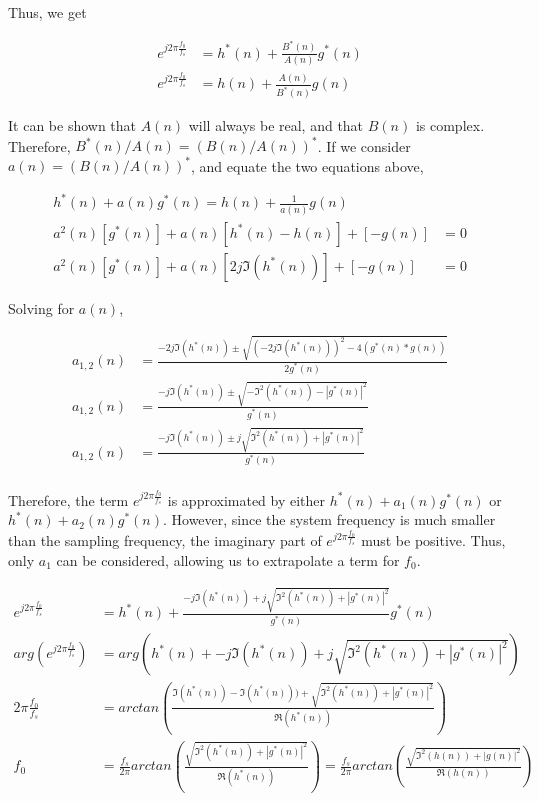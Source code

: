 \documentclass[main.tex]{subfiles}
\begin{document}
Thus, we get

\begin{align*}
e^{j2\pi\frac{f_0}{f_s}} &= h^*(n) + \frac{B^*(n)}{A(n)}g^*(n)\\
e^{j2\pi\frac{f_0}{f_s}} &= h(n) + \frac{A(n)}{B^*(n)}g(n)
\end{align*}

It can be shown that $A(n)$ will always be real, and that $B(n)$ is complex. Therefore, $B^*(n)/A(n) = \left(B(n)/A(n)\right)^*$. If we consider $a(n) = (B(n)/A(n))^*$, and equate the two equations above,

\begin{align*}
h^*(n) + a(n)g^*(n) = h(n) + \frac{1}{a(n)}g(n)\\
a^2(n)\left[g^*(n)\right] + a(n)\left[h^*(n) - h(n)\right] + \left[-g(n)\right] &= 0\\
a^2(n)\left[g^*(n)\right] + a(n)\left[2j\Im(h^*(n))\right] + \left[-g(n)\right] &= 0
\end{align*}

Solving for $a(n)$,

\begin{align*}
a_{1,2}(n) &= \frac{-2j\Im(h^*(n)) \pm \sqrt{ (-2j\Im(h^*(n)))^2 -4(g^*(n) * g(n)) } }{2g^*(n)}\\
a_{1,2}(n) &= \frac{-j\Im(h^*(n)) \pm \sqrt{ -\Im^2(h^*(n)) -|g^*(n)|^2 } }{g^*(n)}\\
a_{1,2}(n) &= \frac{-j\Im(h^*(n)) \pm j\sqrt{ \Im^2(h^*(n)) + |g^*(n)|^2 } }{g^*(n)}\\
\end{align*}

Therefore, the term $e^{j2\pi\frac{f_0}{f_s}}$ is approximated by either $h^*(n) + a_1(n)g^*(n)$ or $h^*(n) + a_2(n)g^*(n)$. However, since the system frequency is much smaller than the sampling frequency, the imaginary part of $e^{j2\pi\frac{f_0}{f_s}}$ must be positive. Thus, only $a_1$ can be considered, allowing us to extrapolate a term for $f_0$.

\begin{align*}
e^{j2\pi\frac{f_0}{f_s}} &= h^*(n) + \frac{-j\Im(h^*(n)) + j\sqrt{ \Im^2(h^*(n)) + |g^*(n)|^2 } }{g^*(n)}g^*(n)\\
arg(e^{j2\pi\frac{f_0}{f_s}}) &= arg\left(h^*(n) + -j\Im(h^*(n)) + j\sqrt{ \Im^2(h^*(n)) + |g^*(n)|^2 } \right)\\
2\pi\frac{f_0}{f_s} &= arctan(\frac{\Im(h^*(n)) - \Im(h^*(n)))+\sqrt{ \Im^2(h^*(n)) + |g^*(n)|^2 }}{\Re(h^*(n))})\\
f_0 &= \frac{f_s}{2\pi}arctan(\frac{\sqrt{ \Im^2(h^*(n)) + |g^*(n)|^2 }}{\Re(h^*(n))}) = \frac{f_s}{2\pi}arctan(\frac{\sqrt{ \Im^2(h(n)) + |g(n)|^2 }}{\Re(h(n))})
\end{align*}
\end{document}
